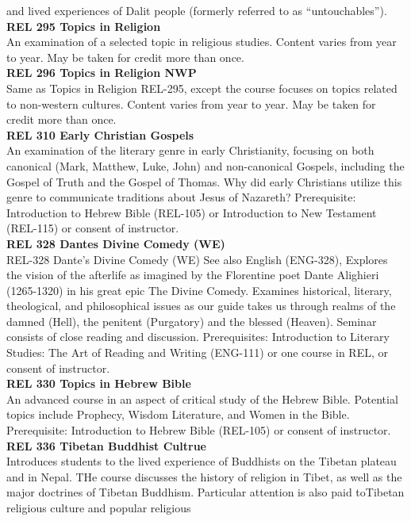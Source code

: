 \documentclass[
  letterpaper,
]{scrbook}
\begin{document}
and lived experiences of Dalit people (formerly referred to as
``untouchables'').\\
\textbf{REL 295 Topics in Religion}\\
An examination of a selected topic in religious studies. Content varies
from year to year. May be taken for credit more than once.\\
\textbf{REL 296 Topics in Religion NWP}\\
Same as Topics in Religion REL-295, except the course focuses on topics
related to non-western cultures. Content varies from year to year. May
be taken for credit more than once.\\
\textbf{REL 310 Early Christian Gospels}\\
An examination of the literary genre in early Christianity, focusing on
both canonical (Mark, Matthew, Luke, John) and non-canonical Gospels,
including the Gospel of Truth and the Gospel of Thomas. Why did early
Christians utilize this genre to communicate traditions about Jesus of
Nazareth? Prerequisite: Introduction to Hebrew Bible (REL-105) or
Introduction to New Testament (REL-115) or consent of instructor.\\
\textbf{REL 328 Dantes Divine Comedy (WE)}\\
REL-328 Dante's Divine Comedy (WE) See also English (ENG-328), Explores
the vision of the afterlife as imagined by the Florentine poet Dante
Alighieri (1265-1320) in his great epic The Divine Comedy. Examines
historical, literary, theological, and philosophical issues as our guide
takes us through realms of the damned (Hell), the penitent (Purgatory)
and the blessed (Heaven). Seminar consists of close reading and
discussion. Prerequisites: Introduction to Literary Studies: The Art of
Reading and Writing (ENG-111) or one course in REL, or consent of
instructor.\\
\textbf{REL 330 Topics in Hebrew Bible}\\
An advanced course in an aspect of critical study of the Hebrew Bible.
Potential topics include Prophecy, Wisdom Literature, and Women in the
Bible. Prerequisite: Introduction to Hebrew Bible (REL-105) or consent
of instructor.\\
\textbf{REL 336 Tibetan Buddhist Cultrue}\\
Introduces students to the lived experience of Buddhists on the Tibetan
plateau and in Nepal. THe course discusses the history of religion in
Tibet, as well as the major doctrines of Tibetan Buddhism. Particular
attention is also paid toTibetan religious culture and popular religious
\end{document}

